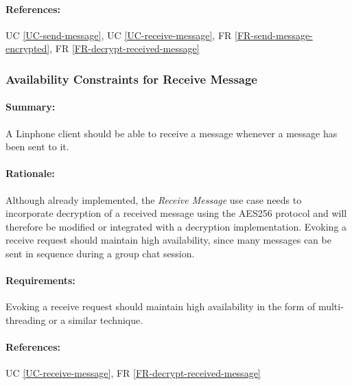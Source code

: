 \documentclass[11pt]{article}
\begin{document}
\paragraph{References:} UC \ref{UC-send-message}, UC \ref{UC-receive-message}, FR \ref{FR-send-message-encrypted}, FR \ref{FR-decrypt-received-message}

\subsubsection{Availability Constraints for Receive Message} \label{NFR-availability-receive-message}
\paragraph{Summary:} A Linphone client should be able to receive a message whenever a message has been sent to it.
\paragraph{Rationale:} Although already implemented, the \textit{Receive Message} use case needs to incorporate decryption of a received message using the AES256 protocol and will therefore be modified or integrated with a decryption implementation. Evoking a receive request should maintain high availability, since many messages can be sent in sequence during a group chat session.
\paragraph{Requirements:} Evoking a receive request should maintain high availability in the form of multi-threading or a similar technique.
\paragraph{References:} UC \ref{UC-receive-message}, FR \ref{FR-decrypt-received-message}


%
%
\end{document}
